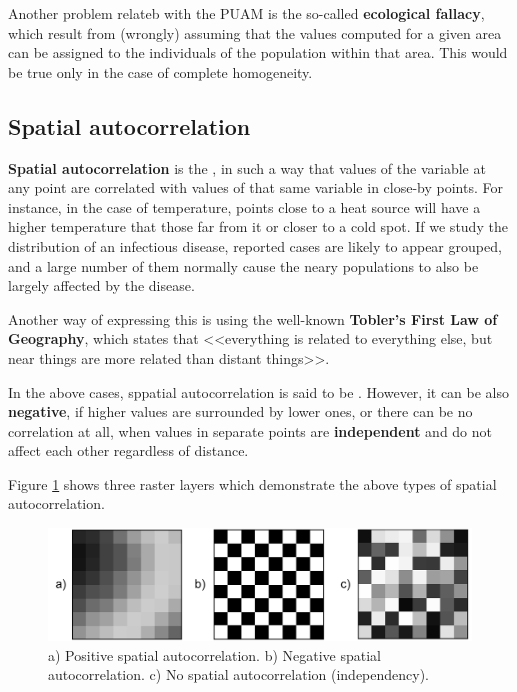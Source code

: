 Another problem relateb with the PUAM is the so-called \textbf{ecological fallacy}, which result from (wrongly) assuming that the values computed for a given area can be assigned to the individuals of the population within that area. This would be true only in the case of complete homogeneity.


\subsection{Spatial autocorrelation} 

\textbf{Spatial autocorrelation} is the , in such a way that values of the variable at any point are correlated with values of that same variable in close-by points. For instance, in the case of temperature, points close to a heat source will have a higher temperature that those far from it or closer to a cold spot. If we study the distribution of an infectious disease, reported cases are likely to appear grouped, and a large number of them normally cause the neary populations to also be largely affected by the disease.

Another way of expressing this is using the well-known \textbf{Tobler's First Law of Geography}, which states that <<everything is related to everything else, but near things are more related than distant things>>.

In the above cases, sppatial autocorrelation is said to be . However, it can be also \textbf{negative}, if higher values are surrounded by lower ones, or there can be no correlation at all, when values in separate points are \textbf{independent} and do not affect each other regardless of distance.

Figure \ref{Fig:Autocorrelation} shows three raster layers which demonstrate the above types of spatial autocorrelation.

\begin{figure}[!hbt]   
\centering
\includegraphics[width=\textwidth]{Analysis/Autocorrelation.png}
\caption{\small a) Positive spatial autocorrelation. b) Negative spatial autocorrelation. c) No spatial autocorrelation (independency).}
\label{Fig:Autocorrelation} 
\end{figure}

